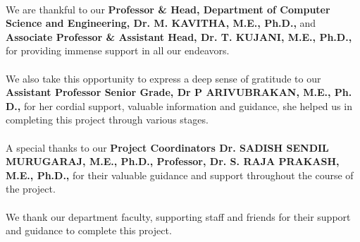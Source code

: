 \documentclass[10pt,openany]{report}
\begin{document}
\begin{sloppypar}
{{\large{\paragraph{}We are thankful to our \textbf{Professor \& Head, Department of Computer Science and Engineering, Dr. M. KAVITHA, M.E., Ph.D., }and \textbf{Associate Professor \& Assistant Head, Dr. T. KUJANI, M.E., Ph.D.,} for providing immense support in all our endeavors.
\large{\paragraph{}We also take this opportunity to express a deep sense of gratitude to our \textbf{Assistant Professor Senior Grade, Dr P ARIVUBRAKAN, M.E., Ph. D.,} for her cordial support, valuable
information and guidance, she helped us in completing this project through various stages. }
\large{\paragraph{}A special thanks to our \textbf{Project Coordinators Dr. SADISH SENDIL MURUGARAJ, M.E., Ph.D., Professor, Dr. S. RAJA PRAKASH, M.E., Ph.D.,} for their valuable guidance and support throughout the course of the project.}

\large{\paragraph{}We thank our department faculty, supporting staff and friends for their support and
guidance to complete this project.}
\begin{sloppypar}


\end{sloppypar}}}}
\end{sloppypar}
\end{document}
